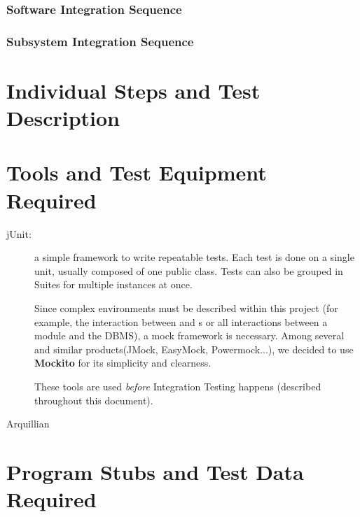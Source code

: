 \documentclass[a4paper, 11pt]{article}
\begin{document}
\subsubsection{Software Integration Sequence} 
\label{ssub:software_integration_sequence}

\subsubsection{Subsystem Integration Sequence} 
\label{ssub:subsystem_integration_sequence}

\section{Individual Steps and Test Description} 
\label{sub:individual_steps_and_test_description}


\section{Tools and Test Equipment Required} 
\label{sub:tools_and_test_equipment_required}

\begin{description}
    \item[jUnit:] a simple framework to write repeatable tests. Each test is done on a single unit, usually composed of one public class. Tests can also be grouped in Suites for multiple instances at once. 

    Since complex environments must be described within this project (for example, the interaction between  and s or all interactions between a module and the DBMS), a mock framework is necessary. Among several and similar products(JMock, EasyMock, Powermock...), we decided to use \textbf{Mockito} for its simplicity and clearness. 

    These tools are used \emph{before} Integration Testing happens (described throughout this document).
    
    \item[Arquillian]
\end{description}


\section{Program Stubs and Test Data Required} 
\label{sub:program_stubs_and_test_data_required}
\end{document}
